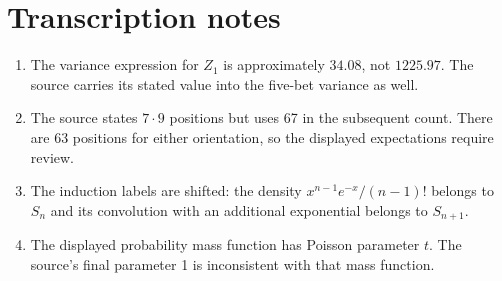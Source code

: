 \documentclass[11pt,a4paper]{article}
\begin{document}
\section*{Transcription notes}
\begin{enumerate}
\item The variance expression for $Z_1$ is approximately $34.08$, not $1225.97$. The source carries its stated value into the five-bet variance as well.
\item The source states $7\cdot9$ positions but uses 67 in the subsequent count. There are 63 positions for either orientation, so the displayed expectations require review.
\item The induction labels are shifted: the density $x^{n-1}e^{-x}/(n-1)!$ belongs to $S_n$ and its convolution with an additional exponential belongs to $S_{n+1}$.
\item The displayed probability mass function has Poisson parameter $t$. The source's final parameter 1 is inconsistent with that mass function.
\end{enumerate}
\end{document}
